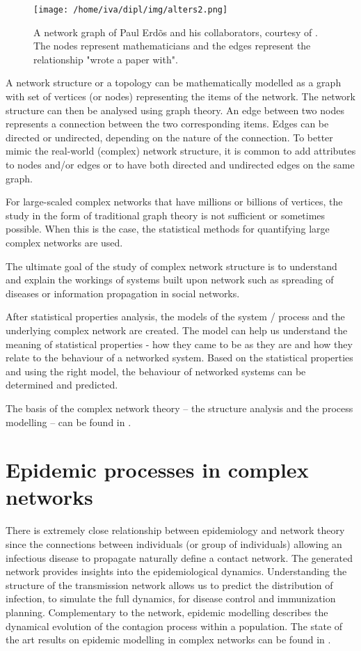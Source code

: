 \documentclass[times, utf8, diplomski]{fer}
\begin{document}
\begin{figure}[htp]
\centering
\texttt{[image: /home/iva/dipl/img/alters2.png]}
\caption{A network graph of Paul Erd\~os and his collaborators, courtesy of \cite{krebs}. The nodes represent mathematicians and the edges represent the relationship "wrote a paper with".}
\label{net}
\end{figure}
A network structure or a topology can be mathematically modelled as a graph with set of vertices (or nodes) representing the items of the network. The network structure can then be analysed using graph theory. An edge between two nodes represents a connection between the two corresponding items. Edges can be directed or undirected, depending  on the nature of the connection.  To better mimic the real-world (complex) network structure, it is common to add attributes to nodes and/or edges or to have both directed and undirected edges on the same graph.

For large-scaled complex networks that have millions or billions of vertices, the study in the form of traditional graph theory is not sufficient or sometimes possible. When this is the case, the statistical methods  for quantifying large complex networks are used. 

The ultimate goal of the study of complex network structure is to understand and explain the workings of systems built upon network such as spreading of diseases or information propagation in social networks.

After statistical properties analysis, the models of the system / process and the underlying complex network are created. The model can help us understand the meaning of statistical properties - how they came to be as they are and how they relate to the behaviour of a networked system. Based on the statistical properties and using the right model, the behaviour of networked systems can be determined and predicted.

The basis of the complex network theory -- the structure  analysis and the process modelling -- can be found in \cite{Newman03thestructure}.

\section{Epidemic processes in complex networks}
There is extremely close relationship between epidemiology and network theory since the connections between individuals (or group of individuals) allowing an infectious disease to propagate naturally define a contact network. The generated network provides insights into the epidemiological dynamics. Understanding the structure of the transmission network allows us to predict the distribution of infection, to simulate the full dynamics, for disease control and immunization planning. Complementary to the network, epidemic modelling describes the dynamical evolution of the contagion process within a population. The state of the art results on epidemic modelling in complex networks can be found in \cite{revmod}.
\end{document}
